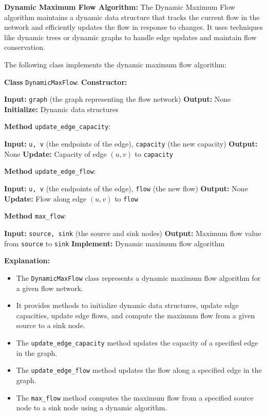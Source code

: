 \documentclass[12pt]{book} %
\begin{document}
\textbf{Dynamic Maximum Flow Algorithm:}
The Dynamic Maximum Flow algorithm maintains a dynamic data structure that tracks the current flow in the network and efficiently updates the flow in response to changes. It uses techniques like dynamic trees or dynamic graphs to handle edge updates and maintain flow conservation.

The following class implements the dynamic maximum flow algorithm:
\FloatBarrier
\begin{algorithm}
\caption{Dynamic Maximum Flow}\label{dynamic-max-flow}
\begin{algorithmic}[1]
\State \textbf{Class} \texttt{DynamicMaxFlow}:
    \State \textbf{Constructor:}

        \State \textbf{Input:} \texttt{graph} (the graph representing the flow network)
        \State \textbf{Output:} None
        \State \textbf{Initialize:} Dynamic data structures

    \State \textbf{Method} \texttt{update\_edge\_capacity}:

        \State \textbf{Input:} \texttt{u, v} (the endpoints of the edge), \texttt{capacity} (the new capacity)
        \State \textbf{Output:} None
        \State \textbf{Update:} Capacity of edge $(u, v)$ to \texttt{capacity}

    \State \textbf{Method} \texttt{update\_edge\_flow}:

        \State \textbf{Input:} \texttt{u, v} (the endpoints of the edge), \texttt{flow} (the new flow)
        \State \textbf{Output:} None
        \State \textbf{Update:} Flow along edge $(u, v)$ to \texttt{flow}

    \State \textbf{Method} \texttt{max\_flow}:

        \State \textbf{Input:} \texttt{source, sink} (the source and sink nodes)
        \State \textbf{Output:} Maximum flow value from \texttt{source} to \texttt{sink}
        \State \textbf{Implement:} Dynamic maximum flow algorithm

\end{algorithmic}
\end{algorithm}
\FloatBarrier
\textbf{Explanation:}
\begin{itemize}
    \item The \texttt{DynamicMaxFlow} class represents a dynamic maximum flow algorithm for a given flow network.
    \item It provides methods to initialize dynamic data structures, update edge capacities, update edge flows, and compute the maximum flow from a given source to a sink node.
    \item The \texttt{update\_edge\_capacity} method updates the capacity of a specified edge in the graph.
    \item The \texttt{update\_edge\_flow} method updates the flow along a specified edge in the graph.
    \item The \texttt{max\_flow} method computes the maximum flow from a specified source node to a sink node using a dynamic algorithm.
\end{itemize}
\end{document}
